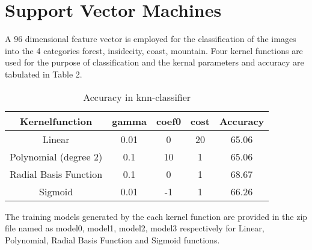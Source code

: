 \documentclass[12pt]{article}
\begin{document}
\section{Support Vector Machines}
A 96 dimensional feature vector is employed for the classification of the images into the 4 categories forest, insidecity, coast, mountain. Four kernel functions are used for the purpose of classification and the kernal parameters and accuracy are tabulated in Table 2.\\
\begin{table}

\begin{center}
		\begin{tabular}{|c |c | c | c | c |}
			\hline
			\textbf{Kernelfunction}  & \textbf{gamma} & \textbf{coef0} & \textbf{cost} & \textbf{Accuracy} \\ \hline
			 Linear & 0.01 & 0 & 20 & 65.06 \\ \hline
			Polynomial (degree 2) & 0.1 & 10 & 1 & 65.06\\ \hline
			Radial Basis Function & 0.1 & 0 & 1 & 68.67   \\ \hline
			Sigmoid & 0.01 & -1 & 1 & 66.26 \\ \hline
			
			
			
		\end{tabular}
\end{center}
\caption{Accuracy in knn-classifier}
\end{table}

The training models generated by the each kernel function are provided in the zip file named as model0, model1, model2, model3 respectively for Linear, Polynomial, Radial Basis Function and Sigmoid functions. 	
\end{document}
